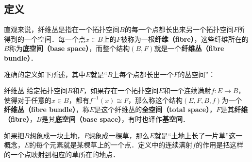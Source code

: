 
\subsection{定义}

直观来说，纤维丛是指在一个拓扑空间$B$的每一个点都长出来另一个拓扑空间$F$所得到的一个空间．每一个点$x\in B$上的$F$被称为一根\textbf{纤维（fibre）}，这些纤维所在的$B$称为\textbf{底空间（base space）}，而整个结构$(B, F)$就是一个\textbf{纤维丛（fibre bundle）}．

准确的定义如下所述，其中$E$就是“$B$上每个点都长出一个$F$的丛空间”：

\begin{definition}{纤维丛}
给定拓扑空间$B$和$F$，如果存在一个拓扑空间$E$和一个连续满射$f:E\rightarrow B$，使得对于任意的$x\in B$，都有$f^{-1}(x)\cong F$，那么称这个结构$(E, F, B, f)$为一个\textbf{纤维丛（fibre bundle）}，称$E$是这个纤维丛的\textbf{全空间（total space）}，$F$是其\textbf{纤维（fibre）}，$B$是其\textbf{底空间（base space）}，有时也译作\textbf{基空间}．
\end{definition}

如果把$B$想象成一块土地，$F$想象成一棵草，那么$E$就是“土地上长了一片草”这一概念，$E$的每个元素就是某棵草上的一个点．定义中的连续满射$f$的作用是把这样的一个点映射到相应的草所在的地点．






